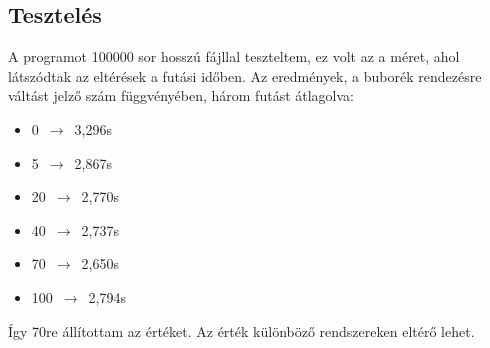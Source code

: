 \documentclass{article}
\begin{document}
	\subsection{Tesztelés}
	A programot 100000 sor hosszú fájllal teszteltem, ez volt az a méret, ahol látszódtak az eltérések a futási időben. Az eredmények, a buborék rendezésre váltást jelző szám függvényében, három futást átlagolva:
	\begin{itemize}
		\item 0 $\,\to\,$ 3,296s
		\item 5 $\,\to\,$  2,867s
		\item 20 $\,\to\,$  2,770s
		\item 40 $\,\to\,$   2,737s
		\item 70 $\,\to\,$   2,650s
		\item 100 $\,\to\,$   2,794s
	\end{itemize}
	Így 70re állítottam az értéket. Az érték különböző rendszereken eltérő lehet.
	
\end{document}

